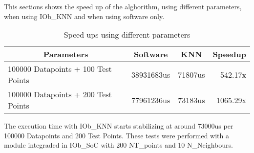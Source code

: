 This sections shows the speed up of the alghorithm, using different parameters, when using IOb\_KNN and when using software only.
\begin{table}[H]
\begin{minipage}{\linewidth}
\centering
\begin{tabular}{|lccr|}
\hline
\multicolumn{1}{|c|}{\textbf{Parameters}} & \multicolumn{1}{c|}{\textbf{Software}} & \multicolumn{1}{c|}{\textbf{KNN}} & \multicolumn{1}{c|}{\textbf{Speedup}} \\ \hline
\rowcolor{iob-blue}
100000 Datapoints + 100 Test Points                                          & 38931683us                                      & 71807us                                 & 542.17x                                     \\
100000 Datapoints + 200 Test Points                                           & 77961236us                                      & 73183us                                 &  1065.29x                                     \\ \hline
\end{tabular}
\end{minipage}
\caption{Speed ups using different parameters}
\end{table}

\noindent The execution time with IOb\_KNN starts stabilizing at around 73000us per 100000 Datapoints and 200 Test Points. These tests were performed with a module integraded in IOb\_SoC with 200 NT\_points and 10 N\_Neighbours.